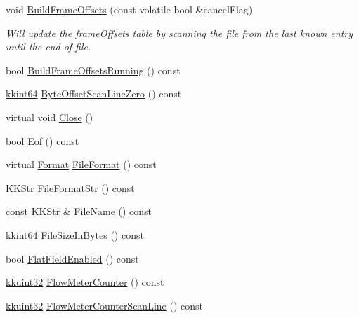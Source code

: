 \begin{DoxyCompactItemize}
void \hyperlink{class_k_k_l_s_c_1_1_scanner_file_a4bbdcc5899d8516417ddd65d86f3acec}{Build\+Frame\+Offsets} (const volatile bool \&cancel\+Flag)
\begin{DoxyCompactList}\small\item\em Will update the \textquotesingle{}frame\+Offsets\textquotesingle{} table by scanning the file from the last known entry until the end of file. \end{DoxyCompactList}\item 
bool \hyperlink{class_k_k_l_s_c_1_1_scanner_file_ab9bfe830cddb6177378e6fa30f05585f}{Build\+Frame\+Offsets\+Running} () const 
\item 
\hyperlink{namespace_k_k_b_aa3486b1c5ea9162b3b020c69f72826eb}{kkint64} \hyperlink{class_k_k_l_s_c_1_1_scanner_file_a2dcb2c31a4534cbc7410e5d1004eb10c}{Byte\+Offset\+Scan\+Line\+Zero} () const 
\item 
virtual void \hyperlink{class_k_k_l_s_c_1_1_scanner_file_a2bbf17cf71339ed9fac45dc8c9ac2a1e}{Close} ()
\item 
bool \hyperlink{class_k_k_l_s_c_1_1_scanner_file_aa27936f0cd06a3e019fa85de52995715}{Eof} () const 
\item 
virtual \hyperlink{class_k_k_l_s_c_1_1_scanner_file_a9eb976c9d084a94db71a5e8d1fadb903}{Format} \hyperlink{class_k_k_l_s_c_1_1_scanner_file_af77a2c70d67e128d4706bfa1bf7dc428}{File\+Format} () const 
\item 
\hyperlink{class_k_k_b_1_1_k_k_str}{K\+K\+Str} \hyperlink{class_k_k_l_s_c_1_1_scanner_file_a669f6d21fef4cb0731f385a51a689aad}{File\+Format\+Str} () const 
\item 
const \hyperlink{class_k_k_b_1_1_k_k_str}{K\+K\+Str} \& \hyperlink{class_k_k_l_s_c_1_1_scanner_file_af7886018ea4211df3e903f780037b618}{File\+Name} () const 
\item 
\hyperlink{namespace_k_k_b_aa3486b1c5ea9162b3b020c69f72826eb}{kkint64} \hyperlink{class_k_k_l_s_c_1_1_scanner_file_a5e4a674a4c05d23caa1f5a50108ea475}{File\+Size\+In\+Bytes} () const 
\item 
bool \hyperlink{class_k_k_l_s_c_1_1_scanner_file_a28fa7f3d03ed4ab94cf6c220c15b67de}{Flat\+Field\+Enabled} () const 
\item 
\hyperlink{namespace_k_k_b_af8d832f05c54994a1cce25bd5743e19a}{kkuint32} \hyperlink{class_k_k_l_s_c_1_1_scanner_file_adf79411cbc2c0f651afc0e2d0f34a82b}{Flow\+Meter\+Counter} () const 
\item 
\hyperlink{namespace_k_k_b_af8d832f05c54994a1cce25bd5743e19a}{kkuint32} \hyperlink{class_k_k_l_s_c_1_1_scanner_file_ac83a8bfbe7f0dafdc326062d278212f7}{Flow\+Meter\+Counter\+Scan\+Line} () const 

\end{DoxyCompactItemize}
